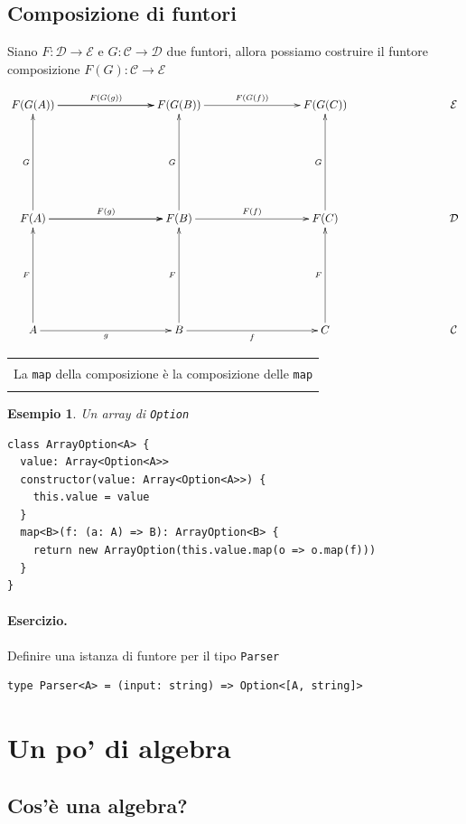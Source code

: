 \documentclass[12pt]{article}
\newtheorem{example}{Esempio}
\newenvironment{boxed}
    {\begin{center}
    \begin{tabular}{|p{0.9\textwidth}|}
    \hline\\
    }
    {
    \\\\\hline
    \end{tabular}
    \end{center}
    }
\begin{document}
\subsection{Composizione di funtori}

Siano $F: \mathcal{D} \rightarrow \mathcal{E}$ e $G: \mathcal{C} \rightarrow \mathcal{D}$ due funtori,
allora possiamo costruire il funtore composizione $F(G): \mathcal{C} \rightarrow \mathcal{E}$

\[
\xymatrixrowsep{3cm}
\xymatrixcolsep{3cm}
\xymatrix{
  F(G(A)) \ar[r]^{F(G(g))} \ar[r] & F(G(B)) \ar[r]^{F(G(f))} & F(G(C)) & \mathcal{E} \\
  F(A) \ar[u]^G \ar[r]^{F(g)} \ar[r] & F(B) \ar[u]^G \ar[r]^{F(f)} & F(C) \ar[u]^G & \mathcal{D} \\
  A \ar[u]^F \ar[r]_g & B \ar[u]^F \ar[r]_f & C \ar[u]^F & \mathcal{C}
}
\]

\begin{boxed}
La \texttt{map} della composizione è la composizione delle \texttt{map}
\end{boxed}

\begin{example}
Un array di \texttt{Option}

\begin{verbatim}
class ArrayOption<A> {
  value: Array<Option<A>>
  constructor(value: Array<Option<A>>) {
    this.value = value
  }
  map<B>(f: (a: A) => B): ArrayOption<B> {
    return new ArrayOption(this.value.map(o => o.map(f)))
  }
}
\end{verbatim}

\end{example}

\paragraph{Esercizio.} Definire una istanza di funtore per il tipo \texttt{Parser}

\begin{verbatim}
type Parser<A> = (input: string) => Option<[A, string]>
\end{verbatim}

\section{Un po' di algebra}

\subsection{Cos'è una algebra?}
\end{document}
